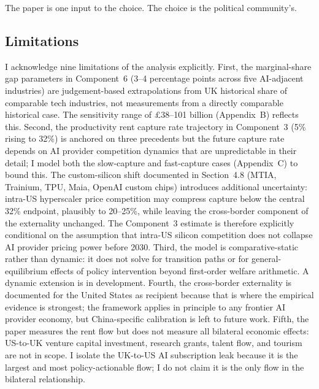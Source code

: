 \documentclass[11pt,letterpaper]{article}
\theoremstyle{remark}
\begin{document}
The paper is one input to the choice. The choice is the political community's.

\subsection*{Limitations}

I acknowledge nine limitations of the analysis explicitly. First, the marginal-share gap parameters in Component~6 (3--4 percentage points across five {AI}-adjacent industries) are judgement-based extrapolations from {UK} historical share of comparable tech industries, not measurements from a directly comparable historical case. The sensitivity range of \pounds38--101 billion (Appendix~B) reflects this. Second, the productivity rent capture rate trajectory in Component~3 (5\% rising to 32\%) is anchored on three precedents but the future capture rate depends on {AI} provider competition dynamics that are unpredictable in their detail; I model both the slow-capture and fast-capture cases (Appendix~C) to bound this. The custom-silicon shift documented in Section~4.8 ({MTIA}, Trainium, {TPU}, Maia, OpenAI custom chips) introduces additional uncertainty: intra-{US} hyperscaler price competition may compress capture below the central 32\% endpoint, plausibly to 20--25\%, while leaving the cross-border component of the externality unchanged. The Component~3 estimate is therefore explicitly conditional on the assumption that intra-{US} silicon competition does not collapse {AI} provider pricing power before 2030. Third, the model is comparative-static rather than dynamic: it does not solve for transition paths or for general-equilibrium effects of policy intervention beyond first-order welfare arithmetic. A dynamic extension is in development. Fourth, the cross-border externality is documented for the United States as recipient because that is where the empirical evidence is strongest; the framework applies in principle to any frontier {AI} provider economy, but China-specific calibration is left to future work. Fifth, the paper measures the rent flow but does not measure all bilateral economic effects: {US}-to-{UK} venture capital investment, research grants, talent flow, and tourism are not in scope. I isolate the {UK}-to-{US} {AI} subscription leak because it is the largest and most policy-actionable flow; I do not claim it is the only flow in the bilateral relationship.
\end{document}
